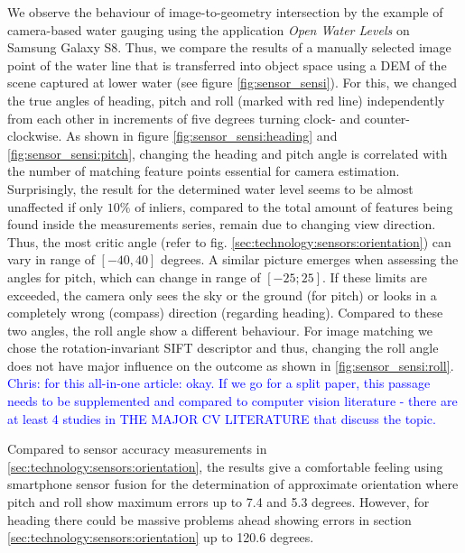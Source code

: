 \documentclass[review]{elsarticle}
\begin{document}
We observe the behaviour of image-to-geometry intersection by the example of camera-based water gauging using the application \textit{Open Water Levels} on Samsung Galaxy S8. Thus, we compare the results of a manually selected image point of the water line that is transferred into object space using a \gls{DEM} of the scene captured at lower water (see figure \ref{fig:sensor_sensi}). For this, we changed the true angles of heading, pitch and roll (marked with red line) independently from each other in increments of five degrees turning clock- and counter-clockwise.
As shown in figure \ref{fig:sensor_sensi:heading} and \ref{fig:sensor_sensi:pitch}, changing the heading and pitch angle is correlated with the number of matching feature points essential for camera estimation. Surprisingly, the result for the determined water level seems to be almost unaffected if only $10\%$ of inliers, compared to the total amount of features being found inside the measurements series, remain due to changing view direction. Thus, the most critic angle (refer to fig. \ref{sec:technology:sensors:orientation}) can vary in range of $[-40,40]$ degrees. A similar picture emerges when assessing the angles for pitch, which can change in range of $[-25;25]$. If these limits are exceeded, the camera only sees the sky or the ground (for pitch) or looks in a completely wrong (compass) direction (regarding heading). Compared to these two angles, the roll angle show a different behaviour. For image matching we chose the rotation-invariant \gls{SIFT} descriptor \cite{Lowe2004} and thus, changing the roll angle does not have major influence on the outcome as shown in \ref{fig:sensor_sensi:roll}.
\textcolor{blue}{Chris: for this all-in-one article: okay. If we go for a split paper, this passage needs to be supplemented and compared to computer vision literature - there are at least 4 studies in THE MAJOR CV LITERATURE that discuss the topic.}

Compared to sensor accuracy measurements in \ref{sec:technology:sensors:orientation}, the results give a comfortable feeling using smartphone sensor fusion for the determination of approximate orientation where pitch and roll show maximum errors up to 7.4 and 5.3 degrees. However, for heading there could be massive problems ahead showing errors in section \ref{sec:technology:sensors:orientation} up to 120.6 degrees.
\end{document}
